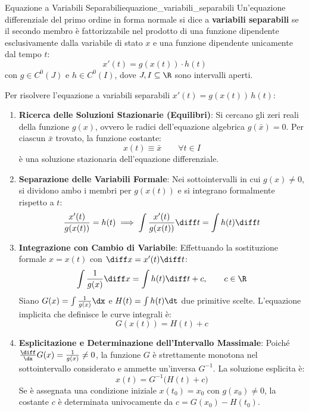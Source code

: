 \begin{definizione}{Equazione a Variabili Separabili}{equazione_variabili_separabili}
Un'equazione differenziale del primo ordine in forma normale si dice a \textbf{variabili separabili} se il secondo membro è fattorizzabile nel prodotto di una funzione dipendente esclusivamente dalla variabile di stato $x$ e una funzione dipendente unicamente dal tempo $t$:
\begin{equation}
    \label{eq:variabili_separabili}
    x'(t) = g(x(t)) \cdot h(t)
\end{equation}
con $g \in C^0(J)$ e $h \in C^0(I)$, dove $J, I \subseteq \R$ sono intervalli aperti.
\end{definizione}

\begin{metodo}
Per risolvere l'equazione a variabili separabili $x'(t) = g(x(t))\, h(t)$:
\begin{enumerate}
    \item \textbf{Ricerca delle Soluzioni Stazionarie (Equilibri)}:
    Si cercano gli zeri reali della funzione $g(x)$, ovvero le radici dell'equazione algebrica $g(\bar{x}) = 0$.
    Per ciascun $\bar{x}$ trovato, la funzione costante:
    \[
        x(t) \equiv \bar{x} \qquad \forall t \in I
    \]
    è una soluzione stazionaria dell'equazione differenziale.
    
    \item \textbf{Separazione delle Variabili Formale}:
    Nei sottointervalli in cui $g(x) \neq 0$, si dividono ambo i membri per $g(x(t))$ e si integrano formalmente rispetto a $t$:
    \[
        \frac{x'(t)}{g(x(t))} = h(t) \implies \int \frac{x'(t)}{g(x(t))} \diff t = \int h(t) \diff t
    \]
    
    \item \textbf{Integrazione con Cambio di Variabile}:
    Effettuando la sostituzione formale $x = x(t)$ con $\diff x = x'(t) \diff t$:
    \[
        \int \frac{1}{g(x)} \diff x = \int h(t) \diff t + c, \qquad c \in \R
    \]
    Siano $G(x) = \int \frac{1}{g(x)} \dx$ e $H(t) = \int h(t) \dt$ due primitive scelte. L'equazione implicita che definisce le curve integrali è:
    \begin{equation}
        \label{eq:separabili_implicita}
        G(x(t)) = H(t) + c
    \end{equation}
    
    \item \textbf{Esplicitazione e Determinazione dell'Intervallo Massimale}:
    Poiché $\frac{\diff}{\dx} G(x) = \frac{1}{g(x)} \neq 0$, la funzione $G$ è strettamente monotona nel sottointervallo considerato e ammette un'inversa $G^{-1}$. La soluzione esplicita è:
    \[
        x(t) = G^{-1}\big( H(t) + c \big)
    \]
    Se è assegnata una condizione iniziale $x(t_0) = x_0$ con $g(x_0) \neq 0$, la costante $c$ è determinata univocamente da $c = G(x_0) - H(t_0)$.
\end{enumerate}
\end{metodo}

